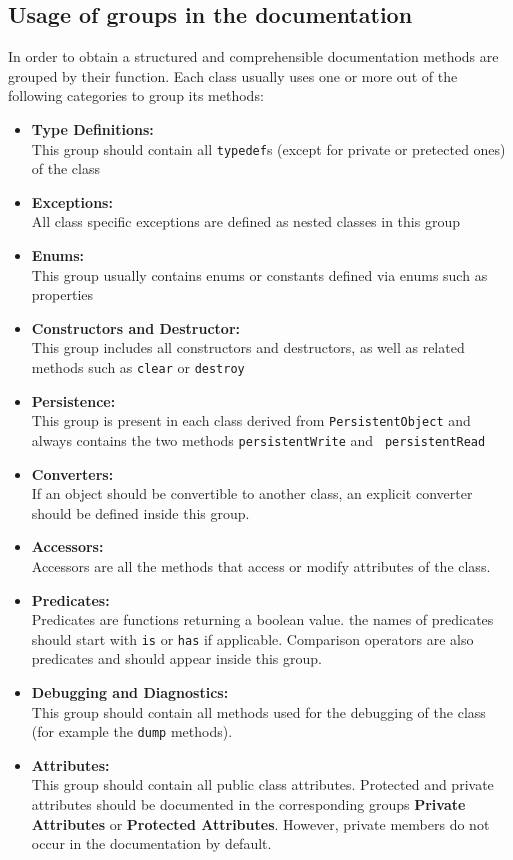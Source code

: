 \documentclass[a4]{article}
\begin{document}
\subsection{Usage of groups in the documentation}

In order to obtain a structured and comprehensible documentation methods are
grouped by their function. Each class usually uses one or more out of the
following categories to group its methods:
\begin{itemize}
	\item {\bf Type Definitions:}\\
		This group should contain all {\tt typedef}s (except for private or pretected
		ones) of the class
	\item {\bf Exceptions:}\\
		All class specific exceptions are defined as nested classes in this group
	\item {\bf Enums:}\\
		This group usually contains enums or constants defined via enums such as
		properties
	\item {\bf Constructors and Destructor:}\\
		This group includes all constructors and destructors, as well as related
		methods such as {\tt clear} or {\tt destroy}
	\item {\bf Persistence:}\\
		This group is present in each class derived from {\tt PersistentObject}
		and always contains the two methods {\tt persistentWrite} and {\tt
		persistentRead}
	\item {\bf Converters:}\\
		If an object should be convertible to another class, an explicit
		converter should be defined inside this group.
	\item {\bf Accessors:}\\
		Accessors are all the methods that access or modify attributes of the
		class.
	\item {\bf Predicates:}\\
		Predicates are functions returning a boolean value. the names of
		predicates should start with {\tt is} or {\tt has} if applicable.
		Comparison operators are also predicates and should appear inside
		this group.
	\item {\bf Debugging and Diagnostics:}\\
		This group should contain all methods used for the debugging of the class
		(for example the {\tt dump} methods).
	\item {\bf Attributes:}\\	
		This group should contain all public class attributes. Protected and
		private attributes should be documented in the corresponding groups
		{\bf Private Attributes} or {\bf Protected Attributes}. However, private 
		members do not occur in the documentation by default.
\end{itemize}
\end{document}
